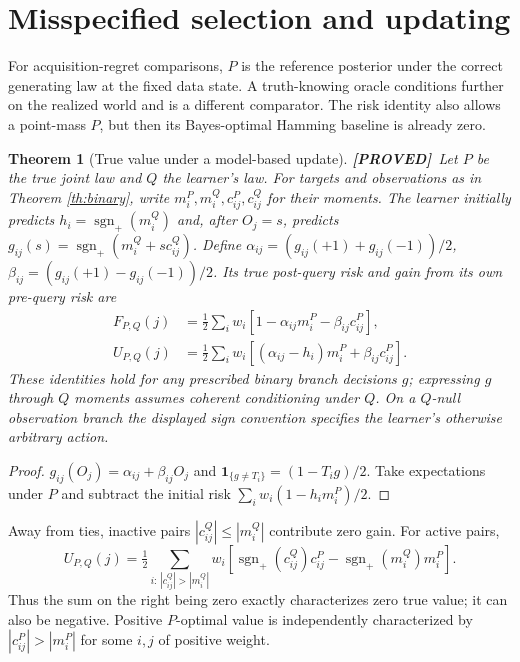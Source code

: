 \documentclass[11pt]{article}
\newtheorem{theorem}{Theorem}[section]
\theoremstyle{definition}
\newcommand{\1}{\mathbf 1}
\newcommand{\sg}{\operatorname{sgn}_{+}}
\newcommand{\pr}{\textbf{[PROVED]}}
\begin{document}
\section{Misspecified selection and updating}
For acquisition-regret comparisons, $P$ is the reference posterior under the
correct generating law at the fixed data state. A truth-knowing oracle
conditions further on the realized world and is a different comparator.
The risk identity also allows a point-mass $P$, but then its Bayes-optimal
Hamming baseline is already zero.
\begin{theorem}[True value under a model-based update]\label{th:PQ}
\pr\ Let $P$ be the true joint law and $Q$ the learner's law.
For targets and observations as in Theorem \ref{th:binary}, write
$m_i^P,m_i^Q,c_{ij}^P,c_{ij}^Q$ for their moments.
The learner initially predicts $h_i=\sg(m_i^Q)$ and, after $O_j=s$,
predicts $g_{ij}(s)=\sg(m_i^Q+s c_{ij}^Q)$.
Define $\alpha_{ij}=(g_{ij}(+1)+g_{ij}(-1))/2$,
$\beta_{ij}=(g_{ij}(+1)-g_{ij}(-1))/2$.
Its true post-query risk and gain from its own pre-query risk are
\begin{align}
 F_{P,Q}(j)&=\tfrac12\sum_iw_i
 [1-\alpha_{ij}m_i^P-\beta_{ij}c_{ij}^P],\label{eq:PQrisk}\\
 U_{P,Q}(j)&=\tfrac12\sum_iw_i
 [(\alpha_{ij}-h_i)m_i^P+\beta_{ij}c_{ij}^P].\label{eq:PQgain}
\end{align}
These identities hold for any prescribed binary branch decisions $g$;
expressing $g$ through $Q$ moments assumes coherent conditioning under $Q$.
On a $Q$-null observation branch the displayed sign convention specifies
the learner's otherwise arbitrary action.
\end{theorem}
\begin{proof}
$g_{ij}(O_j)=\alpha_{ij}+\beta_{ij}O_j$ and
$\1_{\{g\ne T_i\}}=(1-T_ig)/2$. Take expectations under $P$ and subtract
the initial risk $\sum_iw_i(1-h_im_i^P)/2$.
\end{proof}
Away from ties, inactive pairs $|c_{ij}^Q|\le|m_i^Q|$ contribute zero gain.
For active pairs,
\[
 U_{P,Q}(j)=\tfrac12\sum_{i:\,|c_{ij}^Q|>|m_i^Q|}
 w_i[\sg(c_{ij}^Q)c_{ij}^P-\sg(m_i^Q)m_i^P].
\]
Thus the sum on the right being zero exactly characterizes zero true value;
it can also be negative. Positive $P$-optimal value is independently
characterized by $|c_{ij}^P|>|m_i^P|$ for some $i,j$ of positive weight.
\end{document}
